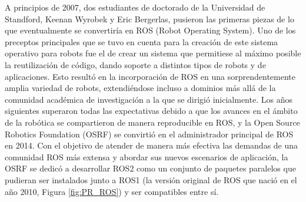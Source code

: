 A principios de 2007, dos estudiantes de doctorado de la Universidad de Standford, Keenan Wyrobek y Eric Bergerlas, pusieron las primeras piezas de lo que eventualmente se convertiría en ROS (Robot Operating System). Uno de los preceptos principales que se tuvo en cuenta para la creación de este sistema operativo para robots fue el de crear un sistema que permitiese al máximo posible la reutilización de código, dando soporte a distintos tipos de robots y de aplicaciones. Esto resultó en la incorporación de ROS en una sorprendentemente amplia variedad de robots, extendiéndose incluso a dominios más allá de la comunidad académica de investigación a la que se dirigió inicialmente. Los años siguientes superaron todas las expectativas debido a que los avances en el ámbito de la robótica se compartieron de manera reproducible en ROS, y la Open Source Robotics Foundation (OSRF) se convirtió en el administrador principal de ROS en 2014. Con el objetivo de atender de manera más efectiva las demandas de una comunidad ROS más extensa y abordar sus nuevos escenarios de aplicación, la OSRF se dedicó a desarrollar ROS2 como un conjunto de paquetes paralelos que pudieran ser instalados junto a ROS1 (la versión original de ROS que nació en el año 2010, Figura \ref{fig:PR_ROS}) y ser compatibles entre sí. %
  

